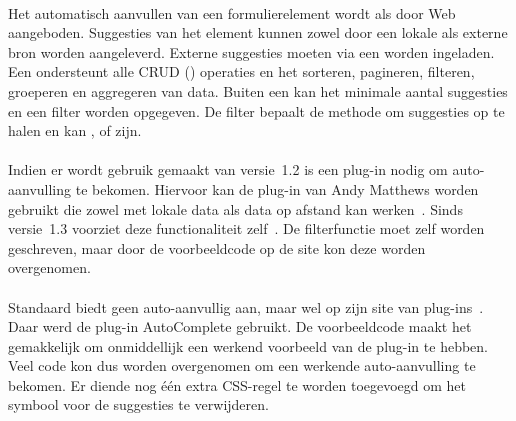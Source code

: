 \paragraph{\kendo}
Het automatisch aanvullen van een formulierelement wordt als  door \kendo{} Web aangeboden.
Suggesties van het element kunnen zowel door een lokale als externe bron worden aangeleverd.
Externe suggesties moeten via een  worden ingeladen.
Een  ondersteunt alle CRUD () operaties en het sorteren, pagineren, filteren, groeperen en aggregeren van data.
Buiten een  kan het minimale aantal suggesties en een filter worden opgegeven.
De filter bepaalt de methode om suggesties op te halen en kan ,  of  zijn.

\paragraph{\jqm}
Indien er wordt gebruik gemaakt van versie~1.2 is een plug-in nodig om auto-aanvulling te bekomen.
Hiervoor kan de plug-in van Andy Matthews worden gebruikt die zowel met lokale data als data op afstand kan werken~\cite{Matthews2013}. 
Sinds versie~1.3 voorziet \jqm{} deze functionaliteit zelf~\cite{JQuery2013c}.
De filterfunctie moet zelf worden geschreven, maar door de voorbeeldcode op de site kon deze worden overgenomen.

\paragraph{\lungo}
Standaard biedt \lungo{} geen auto-aanvullig aan, maar wel op zijn site van plug-ins~\cite{TapQuo2013b}.
Daar werd de plug-in AutoComplete gebruikt.
De voorbeeldcode maakt het gemakkelijk om onmiddellijk een werkend voorbeeld van de plug-in te hebben.
Veel code kon dus worden overgenomen om een werkende auto-aanvulling te bekomen.
Er diende nog één extra CSS-regel te worden toegevoegd om het symbool voor de suggesties te verwijderen.



\subsection{}
\label{sec:evaluatie-gebruik-afbeelding}

